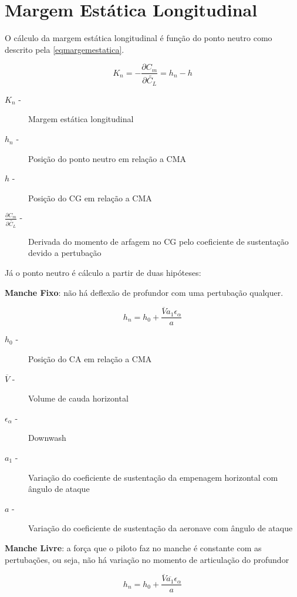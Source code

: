 \section{Margem Estática Longitudinal}
\label{margem}

O cálculo da margem estática longitudinal é função do ponto neutro como descrito pela \autoref{eqmargemestatica}.

\begin{equation}
\label{eqmargemestatica}
K_n = - \frac{\partial C_m}{\partial \widetilde{C_L}} = h_n - h
\end{equation}

\begin{description}
\item[$K_n$  -] Margem estática longitudinal
\item[$h_n$ -] Posição do ponto neutro em relação a CMA
\item[$h$ -] Posição do CG em relação a CMA
\item[$\frac{\partial C_m}{\partial \widetilde{C_L}}$ -] Derivada do momento de arfagem no CG pelo coeficiente de sustentação devido a pertubação
\end{description}

Já o ponto neutro é cálculo a partir de duas hipóteses:


\textbf{Manche Fixo}: não há deflexão de profundor com uma pertubação qualquer.

\begin{equation}
h_n = h_0 + \frac{\overline{V} a_1 \epsilon_{\alpha}}{a}
\end{equation}

\begin{description}
\item[$h_0$  -] Posição do CA em relação a CMA
\item[$\overline{V}$ -] Volume de cauda horizontal
\item[$\epsilon_{\alpha}$ -] Downwash
\item[$a_1$ -] Variação do coeficiente de sustentação da empenagem horizontal com ângulo de ataque
\item[$a$ -] Variação do coeficiente de sustentação da aeronave com ângulo de ataque
\end{description}

\textbf{Manche Livre}: a força que o piloto faz no manche é constante com as pertubações, ou seja, não há variação no momento de articulação do profundor

\begin{equation}
h_n = h_0 + \frac{ \overline{V} \overline{a_1} \epsilon_{\alpha} }{a}
\end{equation}


